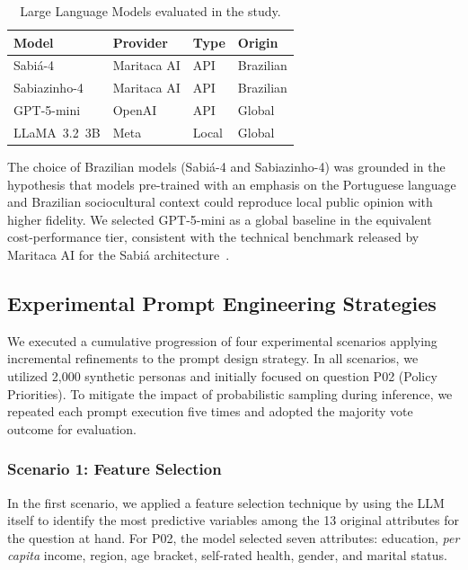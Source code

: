 \begin{table}[htbp]
    \centering
    \caption{Large Language Models evaluated in the study.}
    \label{tab:modelos}
    \begin{tabular}{@{}llll@{}}
        \toprule
        \textbf{Model} & \textbf{Provider} & \textbf{Type} & \textbf{Origin} \\
        \midrule
        Sabiá-4 & Maritaca AI & API & Brazilian \\
        Sabiazinho-4 & Maritaca AI & API & Brazilian \\
        GPT-5-mini & OpenAI & API & Global \\
        LLaMA~3.2~3B & Meta & Local & Global \\
        \bottomrule
    \end{tabular}
\end{table}

The choice of Brazilian models (Sabiá-4 and Sabiazinho-4)
was grounded in the hypothesis that models pre-trained with an emphasis on the
Portuguese language and Brazilian sociocultural context could reproduce local
public opinion with higher fidelity. We selected GPT-5-mini as a
global baseline in the equivalent cost-performance tier, consistent with
the technical benchmark released by Maritaca AI for the Sabiá
architecture~\cite{abonizio_sabia-3_2024}.

\subsection{Experimental Prompt Engineering Strategies}
\label{subsec:cenarios}

We executed a cumulative progression of four experimental scenarios applying
incremental refinements to the prompt design strategy. In all scenarios, we
utilized 2,000 synthetic personas and initially focused on question
P02 (Policy Priorities). To mitigate the impact of probabilistic
sampling during inference, we repeated each prompt execution five times and
adopted the majority vote outcome for evaluation.

\subsubsection{Scenario 1: Feature Selection}
\label{subsubsec:cenario1}

In the first scenario, we applied a feature selection technique by using the
LLM itself to identify the most predictive variables among the
13 original attributes for the question at hand. For P02,
the model selected seven attributes: education,
\textit{per capita} income, region, age bracket,
self-rated health, gender, and marital status.

